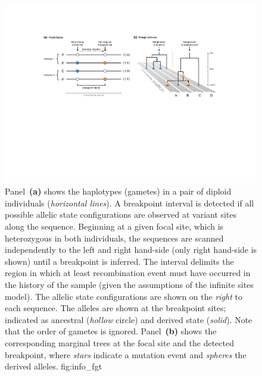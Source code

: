 

\begin{figure}[!htb]
\centering
\includegraphics[width=\textwidth]{./img/ch3/info_fgt_new}
{Panel~\textbf{(a)} shows the  haplotypes (gametes) in a pair of  diploid individuals (\emph{horizontal lines}).
A breakpoint interval is detected if all  possible allelic state configurations are observed at  variant sites along the sequence.
Beginning at a given focal site, which is heterozygous in both individuals, the sequences are scanned independently to the left and right hand-side (only right hand-side is shown) until a breakpoint is inferred.
The interval delimits the region in which at least  recombination event must have occurred in the history of the sample (given the assumptions of the infinite sites model).
The  allelic state configurations are shown on the \emph{right} to each sequence.
The alleles are shown at the  breakpoint sites; indicated as ancestral (\emph{hollow} circle) and derived state (\emph{solid}).
Note that the order of gametes is ignored.
Panel~\textbf{(b)} shows the corresponding marginal trees at the focal site and the detected breakpoint, where \emph{stars} indicate a mutation event and \emph{spheres} the derived alleles.\CorrectLabel}
{fig:info_fgt}
\end{figure}
